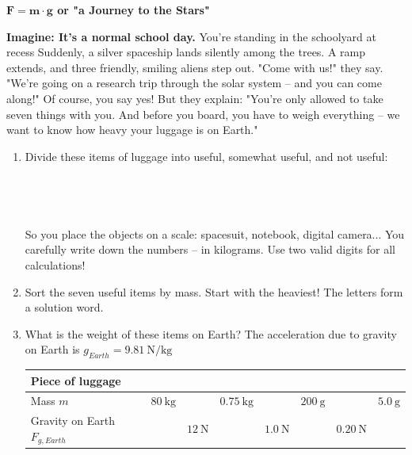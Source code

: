 \documentclass[a4paper]{article}
\begin{document}
	
{\LARGE \bf $ \mathbf{F= m \cdot g} $ or "a Journey to the Stars"}
\vspace{1,5 cm}

\noindent	
	{\bf Imagine: It's a normal school day.}
	You're standing in the schoolyard at recess Suddenly, a silver spaceship lands silently among the trees. A ramp extends, and three friendly, smiling aliens step out.
	"Come with us!" they say. "We're going on a research trip through the solar system – and you can come along!"
	Of course, you say yes! But they explain:
	"You're only allowed to take seven things with you. And before you board, you have to weigh everything – we want to know how heavy your luggage is on Earth."
	
	\begin{enumerate}[1.]
		\item Divide these items of luggage into useful, somewhat useful, and not useful:\\
		\noindent{}
		\\
		\\
		\\
		\\
		
		So you place the objects on a scale: spacesuit, notebook, digital camera...
		You carefully write down the numbers – in kilograms. Use two valid digits for all calculations!
		
		\item Sort the seven useful items by mass. Start with the heaviest! The letters form a solution word.
		\item What is the weight of these items on Earth? The acceleration due to gravity on Earth is $g_{Earth}=\SI{9.81}{\newton\per\kilogram}$
		
		\renewcommand{\arraystretch}{2}
		\begin{tabular}{|p{3 cm}|p{1.5 cm}|p{1.5 cm}|p{1.5 cm}|p{1.5 cm}|p{1.5 cm}|p{1.5 cm}|p{1.5 cm}|}
			\hline
			Piece of luggage & & & & & & & \\
			\hline
			Mass $m$ & $\SI{80}{\kilogram}$ & & $\SI{0.75}{\kilogram}$& & $\SI{200}{\gram}$&& $\SI{5.0}{\gram}$\\
			\hline
			Gravity on Earth $F_{g, Earth}$ & & $\SI{12}{\newton}$ & & $\SI{1.0}{\newton}$ & & $\SI{0.20}{\newton}$ & \\
			\hline
		\end{tabular}
		

\end{enumerate}
\end{document}

